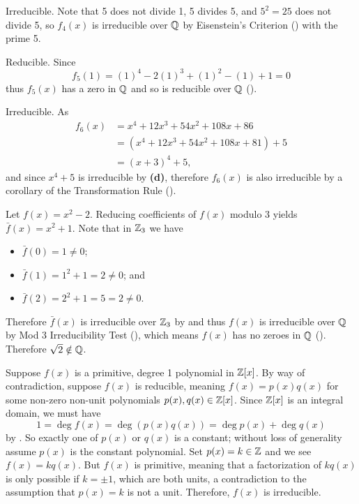 \begin{questions}
\begin{partquestions}{\alph*}
        \item Irreducible. Note that 5 does not divide 1, 5 divides 5, and $5^2 = 25$ does not divide 5, so $f_4(x)$ is irreducible over $\mathbb{Q}$ by Eisenstein's Criterion () with the prime 5.

        \item Reducible. Since
        \[
            f_5(1) = (1)^4 - 2(1)^3 + (1)^2 - (1) + 1 = 0
        \]
        thus $f_5(x)$ has a zero in $\mathbb{Q}$ and so is reducible over $\mathbb{Q}$ ().

        \item Irreducible. As
        \begin{align*}
            f_6(x) &= x^4 + 12x^3 + 54x^2 + 108x + 86\\
            &= (x^4 + 12x^3 + 54x^2 + 108x + 81) + 5\\
            &= (x+3)^4 + 5,
        \end{align*}
        and since $x^4 + 5$ is irreducible by \textbf{(d)}, therefore $f_6(x)$ is also irreducible by a corollary of the Transformation Rule ().
    \end{partquestions}

    \item Let $f(x) = x^2 - 2$. Reducing coefficients of $f(x)$ modulo 3 yields $\bar{f}(x) = x^2 + 1$. Note that in $\mathbb{Z}_3$ we have
    \begin{itemize}
        \item $\bar{f}(0) = 1 \neq 0$;
        \item $\bar{f}(1) = 1^2 + 1 = 2 \neq 0$; and
        \item $\bar{f}(2) = 2^2 + 1 = 5 = 2 \neq 0$.
    \end{itemize}
    Therefore $\bar{f}(x)$ is irreducible over $\mathbb{Z}_3$ by  and thus $f(x)$ is irreducible over $\mathbb{Q}$ by Mod 3 Irreducibility Test (), which means $f(x)$ has no zeroes in $\mathbb{Q}$ (). Therefore $\sqrt2 \notin \mathbb{Q}$.

    \item Suppose $f(x)$ is a primitive, degree 1 polynomial in $\mathbb{Z}[x]$. By way of contradiction, suppose $f(x)$ is reducible, meaning $f(x) = p(x)q(x)$ for some non-zero non-unit polynomials $p(x), q(x) \in \mathbb{Z}[x]$. Since $\mathbb{Z}[x]$ is an integral domain, we must have
    \[
        1 = \deg f(x) = \deg(p(x)q(x)) = \deg p(x) + \deg q(x)
    \]
    by . So exactly one of $p(x)$ or $q(x)$ is a constant; without loss of generality assume $p(x)$ is the constant polynomial. Set $p(x) = k \in \mathbb{Z}$ and we see $f(x) = kq(x)$. But $f(x)$ is primitive, meaning that a factorization of $kq(x)$ is only possible if $k = \pm1$, which are both units, a contradiction to the assumption that $p(x) = k$ is not a unit. Therefore, $f(x)$ is irreducible.


\end{questions}
